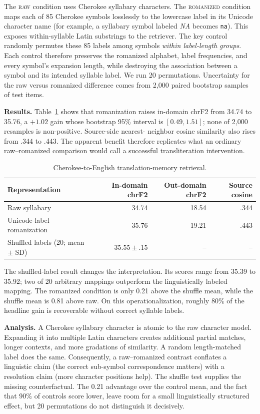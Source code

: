 \documentclass[12pt]{article}
\begin{document}
The \textsc{raw} condition uses Cherokee syllabary characters. The
\textsc{romanized} condition maps each of 85 Cherokee symbols losslessly to the
lowercase label in its Unicode character name (for example, a syllabary symbol
labeled \emph{NA} becomes \texttt{na}). This exposes within-syllable Latin
substrings to the retriever. The key control randomly permutes these 85 labels
among symbols \emph{within label-length groups}. Each control therefore
preserves the romanized alphabet, label frequencies, and every symbol's
expansion length, while destroying the association between a symbol and its
intended syllable label. We run 20 permutations. Uncertainty for the raw versus
romanized difference comes from 2,000 paired bootstrap samples of test items.

\textbf{Results.}
Table~\ref{tab:results} shows that romanization raises in-domain chrF2 from
34.74 to 35.76, a $+1.02$ gain whose bootstrap 95\% interval is
$[0.49,1.51]$; none of 2,000 resamples is non-positive. Source-side nearest-
neighbor cosine similarity also rises from .344 to .443. The apparent benefit
therefore replicates what an ordinary raw--romanized comparison would call a
successful transliteration intervention.

\begin{table}[h]
\centering
\caption{Cherokee-to-English translation-memory retrieval.}
\label{tab:results}
\vspace{-0.1em}
\begin{tabular}{@{}lrrr@{}}
\toprule
Representation & In-domain chrF2 & Out-domain chrF2 & Source cosine\\
\midrule
Raw syllabary & 34.74 & 18.54 & .344\\
Unicode-label romanization & 35.76 & 19.21 & .443\\
Shuffled labels (20; mean $\pm$ SD) & $35.55\pm.15$ & -- & --\\
\bottomrule
\end{tabular}
\end{table}
\vspace{-0.6em}

The shuffled-label result changes the interpretation. Its scores range from
35.39 to 35.92; two of 20 arbitrary mappings outperform the linguistically
labeled mapping. The romanized condition is only 0.21 above the shuffle mean,
while the shuffle mean is 0.81 above raw. On this operationalization, roughly
80\% of the headline gain is recoverable without correct syllable labels.

\textbf{Analysis.}
A Cherokee syllabary character is atomic to the raw character model. Expanding
it into multiple Latin characters creates additional partial matches, longer
contexts, and more gradations of similarity. A random length-matched label does
the same. Consequently, a raw--romanized contrast conflates a linguistic claim
(the correct sub-symbol correspondence matters) with a resolution claim (more
character positions help). The shuffle test supplies the missing counterfactual.
The 0.21 advantage over the control mean, and the fact that 90\% of controls
score lower, leave room for a small linguistically structured effect, but 20
permutations do not distinguish it decisively.
\end{document}
